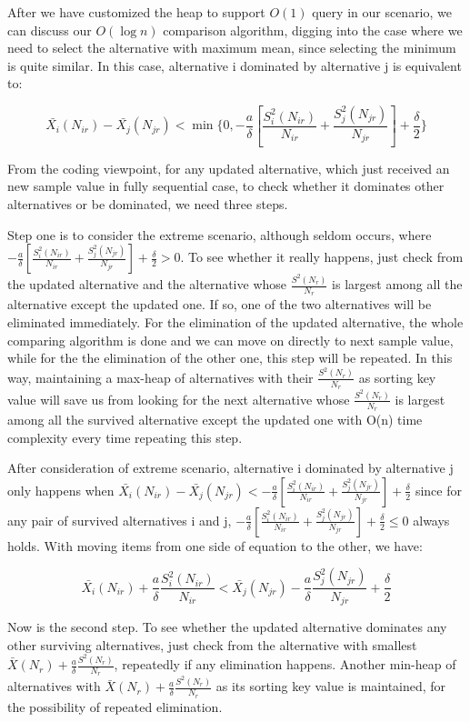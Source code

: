 After we have customized the heap to support $O(1)$ query in our scenario, we can discuss our $O(\log{n})$ comparison algorithm, digging into the case where we need to select the alternative with maximum mean, since selecting the minimum is quite similar. In this case, alternative i dominated by alternative j is equivalent to:

$$ \bar{X_{i}}(N_{ir}) - \bar{X_{j}}(N_{jr}) < \min\{0, -\frac{a}{\delta}[\frac{S_i^2(N_{ir})}{N_{ir}} + \frac{S_j^2(N_{jr})}{N_{jr}}] + \frac{\delta}{2}\} $$

From the coding viewpoint, for any updated alternative, which just received an new sample value in fully sequential case, to check whether it dominates other alternatives or be dominated, we need three steps.

Step one is to consider the extreme scenario, although seldom occurs, where $-\frac{a}{\delta}[\frac{S_i^2(N_{ir})}{N_{ir}} + \frac{S_j^2(N_{jr})}{N_{jr}}] + \frac{\delta}{2} > 0$. To see whether it really happens, just check from the updated alternative and the alternative whose $\frac{S^2(N_r)}{N_r}$ is largest among all the alternative except the updated one. If so, one of the two alternatives will be eliminated immediately. For the elimination of the updated alternative, the whole comparing algorithm is done and we can move on directly to next sample value, while for the the elimination of the other one, this step will be repeated. In this way, maintaining a max-heap of alternatives with their $\frac{S^2(N_r)}{N_r}$ as sorting key value will save us from looking for the next alternative whose $\frac{S^2(N_r)}{N_r}$ is largest among all the survived alternative except the updated one with O(n) time complexity every time repeating this step.

After consideration of extreme scenario, alternative i dominated by alternative j only happens when
$ \bar{X_{i}}(N_{ir}) - \bar{X_{j}}(N_{jr}) < -\frac{a}{\delta}[\frac{S_i^2(N_{ir})}{N_{ir}} + \frac{S_j^2(N_{jr})}{N_{jr}}] + \frac{\delta}{2} $ since for any pair of survived alternatives i and j, $-\frac{a}{\delta}[\frac{S_i^2(N_{ir})}{N_{ir}} + \frac{S_j^2(N_{jr})}{N_{jr}}] + \frac{\delta}{2} \le 0$ always holds. With moving items from one side of equation to the other, we have:

$$ \bar{X_{i}}(N_{ir}) + \frac{a}{\delta}\frac{S_i^2(N_{ir})}{N_{ir}} < \bar{X_{j}}(N_{jr}) - \frac{a}{\delta}\frac{S_j^2(N_{jr})}{N_{jr}} + \frac{\delta}{2} $$

Now is the second step. To see whether the updated alternative dominates any other surviving alternatives, just check from the alternative with smallest $\bar{X}(N_r) + \frac{a}{\delta}\frac{S^2(N_r)}{N_r}$, repeatedly if any elimination happens. Another min-heap of alternatives with $\bar{X}(N_r) + \frac{a}{\delta}\frac{S^2(N_r)}{N_r}$ as its sorting key value is maintained, for the possibility of repeated elimination.


